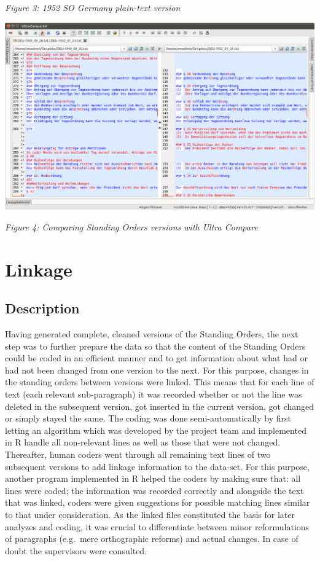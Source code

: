 \documentclass[10pt,]{article}
\begin{document}
\emph{Figure 3: 1952 SO Germany plain-text version}

\begin{center}
\includegraphics[width=\textwidth]{fig/fig3a.png}
\end{center}

\emph{Figure 4: Comparing Standing Orders versions with Ultra Compare}

\newpage

\section{Linkage}\label{linkage}

\subsection{Description}\label{description}

Having generated complete, cleaned versions of the Standing Orders, the
next step was to further prepare the data so that the content of the
Standing Orders could be coded in an efficient manner and to get
information about what had or had not been changed from one version to
the next. For this purpose, changes in the standing orders between
versions were linked. This means that for each line of text (each
relevant sub-paragraph) it was recorded whether or not the line was
deleted in the subsequent version, got inserted in the current version,
got changed or simply stayed the same. The coding was done
semi-automatically by first letting an algorithm which was developed by
the project team and implemented in R handle all non-relevant lines as
well as those that were not changed. Thereafter, human coders went
through all remaining text lines of two subsequent versions to add
linkage information to the data-set. For this purpose, another program
implemented in R helped the coders by making sure that: all lines were
coded; the information was recorded correctly and alongside the text
that was linked, coders were given suggestions for possible matching
lines similar to that under consideration. As the linked files
constituted the basis for later analyzes and coding, it was crucial to
differentiate between minor reformulations of paragraphs (e.g.~mere
orthographic reforms) and actual changes. In case of doubt the
supervisors were consulted.
\end{document}
